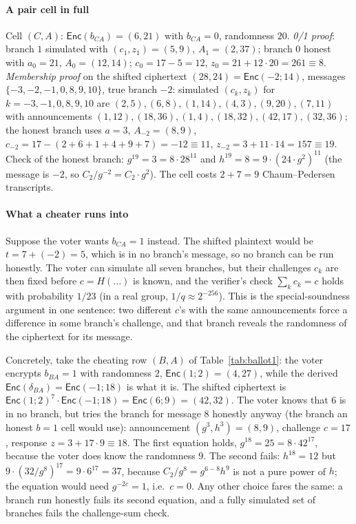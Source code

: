 \documentclass[11pt,a4paper]{article}
\newcommand{\Enc}{\mathsf{Enc}}
\theoremstyle{remark}
\begin{document}
\paragraph{A pair cell in full} Cell $(C, A)$: $\Enc(b_{CA}) = (6, 21)$
with $b_{CA} = 0$, randomness $20$.
\emph{0/1 proof}: branch $1$ simulated with $(c_1, z_1) = (5, 9)$, $A_1 =
(2, 37)$; branch $0$ honest with $a_0 = 21$, $A_0 = (12, 14)$; $c_0 = 17 -
5 = 12$, $z_0 = 21 + 12 \cdot 20 = 261 \equiv 8$. \emph{Membership proof}
on the shifted ciphertext $(28, 24) = \Enc(-2; 14)$, messages $\{-3, -2,
-1, 0, 8, 9, 10\}$, true branch $-2$: simulated $(c_k, z_k)$ for $k = -3,
-1, 0, 8, 9, 10$ are $(2,5), (6,8), (1,14), (4,3), (9,20), (7,11)$ with
announcements $(1,12), (18,36), (1,4), (18,32), (42,17), (32,36)$; the
honest branch uses $a = 3$, $A_{-2} = (8, 9)$, $c_{-2} = 17 - (2 + 6 + 1 +
4 + 9 + 7) = -12 \equiv 11$, $z_{-2} = 3 + 11 \cdot 14 = 157 \equiv 19$.
Check of the honest branch: $g^{19} = 3 = 8 \cdot 28^{11}$ and $h^{19}
= 8 = 9 \cdot (24 \cdot g^{2})^{11}$ (the message is $-2$, so $C_2 /
g^{-2} = C_2 \cdot g^{2}$). The cell costs $2 + 7 = 9$ Chaum--Pedersen transcripts.

\paragraph{What a cheater runs into} Suppose the voter wants $b_{CA} = 1$
instead. The shifted plaintext would be $t = 7 + (-2) = 5$, which is in no
branch's message, so no branch can be run honestly. The voter can
simulate all seven branches, but their challenges $c_k$ are then fixed
before $c = H(\ldots)$ is known, and the verifier's check $\sum_k c_k = c$
holds with probability $1/23$ (in a real group, $1/q \approx 2^{-256}$).
This is the special-soundness argument in one sentence: two different
$c$'s with the same announcements force a difference in some branch's
challenge, and that branch reveals the randomness of the ciphertext for
its message.

Concretely, take the cheating row $(B, A)$ of Table~\ref{tab:ballot1}:
the voter encrypts $b_{BA} = 1$ with randomness $2$, $\Enc(1; 2) = (4,
27)$, while the derived $\Enc(\delta_{BA}) = \Enc(-1; 18)$ is what it is.
The shifted ciphertext is $\Enc(1; 2)^7 \cdot \Enc(-1; 18) = \Enc(6; 9) =
(42, 32)$. The voter knows that $6$ is in no branch, but tries the branch
for message $8$ honestly anyway (the branch an honest $b = 1$ cell would
use): announcement $(g^3, h^3) = (8, 9)$, challenge $c = 17$, response $z
= 3 + 17 \cdot 9 \equiv 18$. The first equation holds, $g^{18} = 25 = 8
\cdot 42^{17}$, because the voter does know the randomness $9$. The
second fails: $h^{18} = 12$ but $9 \cdot (32 / g^{8})^{17} = 9 \cdot
6^{17} = 37$, because $C_2 / g^8 = g^{6 - 8} h^{9}$ is not a pure power
of $h$; the equation would need $g^{-2c} = 1$, i.e.\ $c = 0$. Any other
choice fares the same: a branch run honestly fails its second equation,
and a fully simulated set of branches fails the challenge-sum check.
\end{document}
